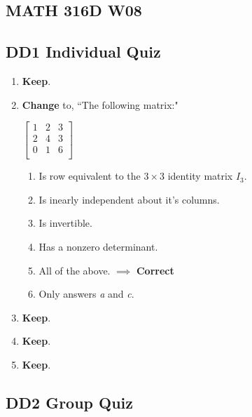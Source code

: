 \documentclass[fleqn]{article}[11pt]
\begin{document}
	
\begin{center}\section*{MATH 316D W08}\end{center}
\subsection*{DD1 Individual Quiz}

\begin{enumerate}
	
	\item \textbf{Keep}.
	
	\item \textbf{Change} to, ``The following matrix:"
	
		\(\begin{bmatrix}
			1 & 2 & 3 \\
			2 & 4 & 3 \\
			0 & 1 & 6 \\
		\end{bmatrix}\)
			\begin{enumerate}
			 	\item Is row equivalent to the $3\times 3$ identity matrix $I_{3}$.
				\item Is inearly independent about it's columns.
				\item Is invertible.
				\item Has a nonzero determinant.
				\item All of the above. $\implies$ \textbf{Correct}
				\item Only answers \textit{\textup{a}} and \textit{\textup{c}}.
			 \end{enumerate}
	
	\item \textbf{Keep}.
	
	\item \textbf{Keep}.
	
	\item \textbf{Keep}.
\end{enumerate}

\subsection*{DD2 Group Quiz}
\end{document}
